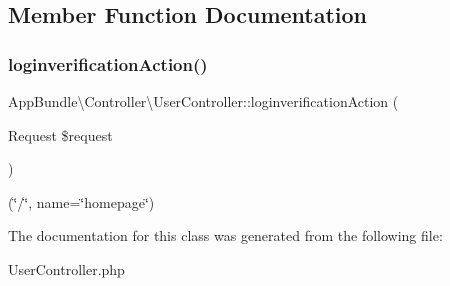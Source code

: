 \subsection{Member Function Documentation}
\mbox{\label{class_app_bundle_1_1_controller_1_1_user_controller_a268cbed26597ca6ca90c00b8a2bcd0c9}} 
\subsubsection{\texorpdfstring{loginverification\+Action()}{loginverificationAction()}}
{\footnotesize\ttfamily App\+Bundle\textbackslash{}\+Controller\textbackslash{}\+User\+Controller\+::loginverification\+Action (\begin{DoxyParamCaption}\item[{Request}]{\$request }\end{DoxyParamCaption})}

(\char`\"{}/\char`\"{}, name=\char`\"{}homepage\char`\"{}) 

The documentation for this class was generated from the following file\+:\begin{DoxyCompactItemize}
\item 
User\+Controller.\+php\end{DoxyCompactItemize}
